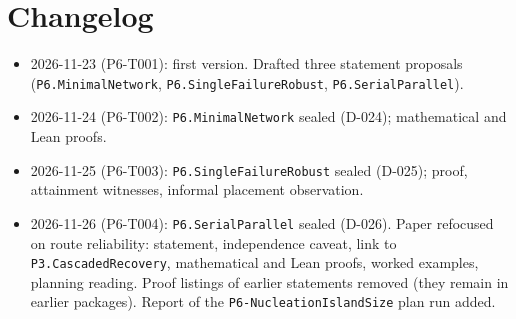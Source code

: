\documentclass[11pt]{article}
\begin{document}
\section*{Changelog}
\begin{itemize}
\item 2026-11-23 (P6-T001): first version. Drafted three statement proposals
(\texttt{P6.MinimalNetwork}, \texttt{P6.SingleFailureRobust}, \texttt{P6.SerialParallel}).
\item 2026-11-24 (P6-T002): \texttt{P6.MinimalNetwork} sealed (D-024); mathematical and Lean proofs.
\item 2026-11-25 (P6-T003): \texttt{P6.SingleFailureRobust} sealed (D-025); proof, attainment witnesses,
informal placement observation.
\item 2026-11-26 (P6-T004): \texttt{P6.SerialParallel} sealed (D-026). Paper refocused on route reliability:
statement, independence caveat, link to \texttt{P3.CascadedRecovery}, mathematical and Lean proofs,
worked examples, planning reading. Proof listings of earlier statements removed (they remain in earlier
packages). Report of the \texttt{P6-NucleationIslandSize} plan run added.
\end{itemize}



\end{document}
